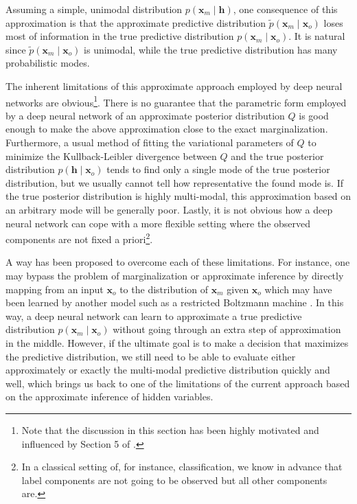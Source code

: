 \documentclass[dissertation,nocontribution,draft*]{aaltoseries}
\newcommand{\vect}[1]{\mathbf{#1}}
\newcommand{\vh}[0]{\vect{h}}
\newcommand{\vx}[0]{\vect{x}}
\begin{document}
Assuming a simple, unimodal distribution $p(\vx_m \mid
\vh)$, one consequence of this approximation is that the
approximate predictive distribution $\tilde{p}(\vx_m \mid
\vx_o)$ loses most of information in the true predictive
distribution $p(\vx_m \mid \vx_o)$. It is natural since
$\tilde{p}(\vx_m \mid \vx_o)$ is unimodal, while the true
predictive distribution has many probabilistic modes.

The inherent limitations of this approximate approach
employed by deep neural networks are obvious\footnote{Note
that the discussion in this section has been highly
motivated and influenced by Section 5 of
\citep{Bengio2013future}.}. There is no guarantee that the
parametric form employed by a deep neural network of an
approximate posterior distribution $Q$ is good enough to
make the above approximation close to the exact
marginalization.  Furthermore, a usual method of fitting the
variational parameters of $Q$ to minimize the
Kullback-Leibler divergence between $Q$ and the true
posterior distribution $p(\vh \mid \vx_o)$ tends to find
only a single mode of the true posterior distribution, but
we usually cannot tell how representative the found mode is.
If the true posterior distribution is highly multi-modal,
this approximation based on an arbitrary mode will be
generally poor.  Lastly, it is not obvious how a deep neural
network can cope with a more flexible setting where the
observed components are not fixed a priori\footnote{In a
classical setting of, for instance, classification, we know
in advance that label components are not going to be
observed but all other components are.}. 

A way has been proposed to overcome each of these
limitations. For instance, one may bypass the problem of
marginalization or approximate inference by directly mapping
from an input $\vx_o$ to the distribution of $\vx_m$ given
$\vx_o$ which may have been learned by another model such as
a restricted Boltzmann machine \citep{Mnih2011}. In this
way, a deep neural network can learn to approximate a true
predictive distribution $p(\vx_m \mid \vx_o)$ without going
through an extra step of approximation in the middle.
However, if the ultimate goal is to make a decision that
maximizes the predictive distribution, we still need to be
able to evaluate either approximately or exactly the
multi-modal predictive distribution quickly and well, which
brings us back to one of the limitations of the current
approach based on the approximate inference of hidden
variables.
\end{document}
